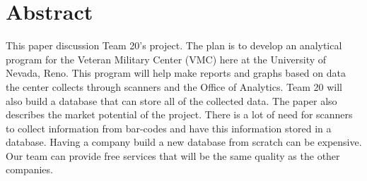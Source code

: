 \section{Abstract}
\label{sect:abstract}


This paper discussion Team 20's project. The plan is to develop an analytical program for the Veteran Military Center (VMC) here at the University of Nevada, Reno. This program will help make reports and graphs based on data the center collects through scanners and the Office of Analytics. Team 20 will also build a database that can store all of the collected data. The paper also describes the market potential of the project. There is a lot of need for scanners to collect information from bar-codes and have this information stored in a database. Having a company build a new database from scratch can be expensive. Our team can provide free services that will be the same quality as the other companies.


